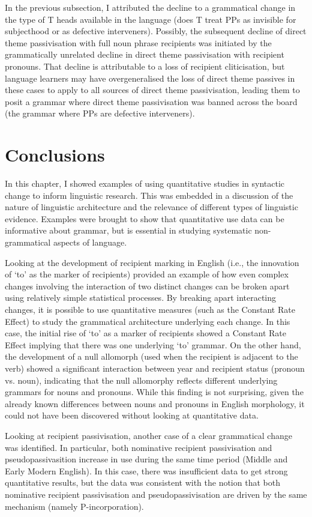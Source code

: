 	In the previous subsection, I attributed the decline to a grammatical change in the type of T heads available in the language (does T treat PPs as invisible for subjecthood or as defective interveners). Possibly, the subsequent decline of direct theme passivisation with full noun phrase recipients was initiated by the grammatically unrelated decline in direct theme passivisation with recipient pronouns. That decline is attributable to a loss of recipient cliticisation, but language learners may have overgeneralised the loss of direct theme passives in these cases to apply to all sources of direct theme passivisation, leading them to posit a grammar where direct theme passivisation was banned across the board (the grammar where PPs are defective interveners).

\section{Conclusions}
	In this chapter, I showed examples of using quantitative studies in syntactic change to inform linguistic research. This was embedded in a discussion of the nature of linguistic architecture and the relevance of different types of linguistic evidence. Examples were brought to show that quantitative use data can be informative about grammar, but is essential in studying systematic non-grammatical aspects of language.
	
	Looking at the development of recipient marking in English (i.e., the innovation of `to' as the marker of recipients) provided an example of how even complex changes involving the interaction of two distinct changes can be broken apart using relatively simple statistical processes. By breaking apart interacting changes, it is possible to use quantitative measures (such as the Constant Rate Effect) to study the grammatical architecture underlying each change. In this case, the initial rise of `to' as a marker of recipients showed a Constant Rate Effect implying that there was one underlying `to' grammar. On the other hand, the development of a null allomorph (used when the recipient is adjacent to the verb) showed a significant interaction between year and recipient status (pronoun vs. noun), indicating that the null allomorphy reflects different underlying grammars for nouns and pronouns. While this finding is not surprising, given the already known differences between nouns and pronouns in English morphology, it could not have been discovered without looking at quantitative data.
	
	Looking at recipient passivisation, another case of a clear grammatical change was identified. In particular, both nominative recipient passivisation and pseudopassivasition increase in use during the same time period (Middle and Early Modern English). In this case, there was insufficient data to get strong quantitative results, but the data was consistent with the notion that both nominative recipient passivisation and pseudopassivisation are driven by the same mechanism (namely P-incorporation).

